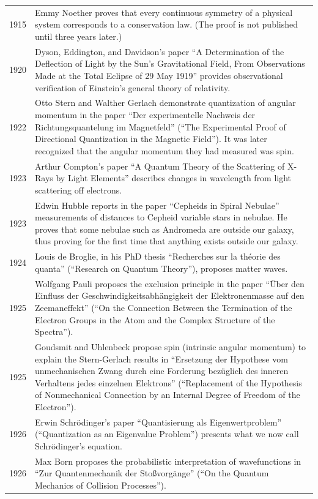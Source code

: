 \documentclass[../../main.tex]{subfiles}
\begin{document}
\begin{center}
\begin{longtable}{p{}  p{}}
1915&Emmy Noether proves that every continuous symmetry of a physical system corresponds to a conservation law. (The proof is not published until three years later.)\\
1920&Dyson, Eddington, and Davidson's paper “A Determination of the Deflection of Light by the Sun's Gravitational Field, From Observations Made at the Total Eclipse of 29 May 1919” provides observational verification of Einstein's general theory of relativity.\\
1922&Otto Stern and Walther Gerlach demonstrate quantization of angular momentum in the paper “Der experimentelle Nachweis der Richtungsquantelung im Magnetfeld” (“The Experimental Proof of Directional Quantization in the Magnetic Field”). It was later recognized that the angular momentum they had measured was spin.\\
1923&Arthur Compton's paper “A Quantum Theory of the Scattering of X-Rays by Light Elements” describes changes in wavelength from light scattering off electrons.\\
1923&Edwin Hubble reports in the paper “Cepheids in Spiral Nebulae” measurements of distances to Cepheid variable stars in nebulae. He proves that some nebulae such as Andromeda are outside our galaxy, thus proving for the first time that anything exists outside our galaxy.\\
1924&Louis de Broglie, in his PhD thesis “Recherches sur la théorie des quanta” (“Research on Quantum Theory”), proposes matter waves.\\
1925&Wolfgang Pauli proposes the exclusion principle in the paper “Über den Einfluss der Geschwindigkeitsabhängigkeit der Elektronenmasse auf den Zeemaneffekt” (“On the Connection Between the Termination of the Electron Groups in the Atom and the Complex Structure of the Spectra”).\\
1925&Goudsmit and Uhlenbeck propose spin (intrinsic angular momentum) to explain the Stern-Gerlach results in “Ersetzung der Hypothese vom unmechanischen Zwang durch eine Forderung bezüglich des inneren Verhaltens jedes einzelnen Elektrons” (“Replacement of the Hypothesis of Nonmechanical Connection by an Internal Degree of Freedom of the Electron”).\\
1926&Erwin Schrödinger's paper “Quantisierung als Eigenwertproblem” (“Quantization as an Eigenvalue Problem”) presents what we now call Schrödinger's equation.\\
1926&Max Born proposes the probabilistic interpretation of wavefunctions in “Zur Quantenmechanik der Stoßvorgänge” (“On the Quantum Mechanics of Collision Processes”).\\

\end{longtable}
\end{center}
\end{document}
